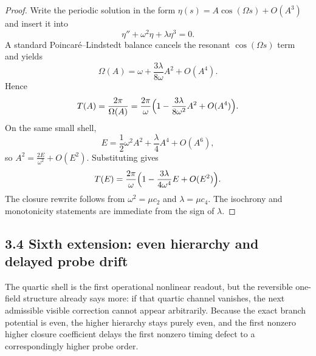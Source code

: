 \documentclass[12pt,a4paper]{article}
\begin{document}
\begin{proof}
Write the periodic solution in the form $\eta(s)=A\cos(\Omega s)+O(A^3)$ and insert it into
\[
 \eta''+\omega^2\eta+\lambda\eta^3=0.
\]
A standard Poincar\'e--Lindstedt balance cancels the resonant $\cos(\Omega s)$ term and yields
\[
 \Omega(A)=\omega+\frac{3\lambda}{8\omega}A^2+O(A^4).
\]
Hence
\[
 T(A)=\frac{2\pi}{\Omega(A)}
 =\frac{2\pi}{\omega}\Bigl(1-\frac{3\lambda}{8\omega^2}A^2+O(A^4)\Bigr).
\]
On the same small shell,
\[
 E=\frac12\omega^2A^2+\frac{\lambda}{4}A^4+O(A^6),
\]
so $A^2=\tfrac{2E}{\omega^2}+O(E^2)$. Substituting gives
\[
 T(E)=\frac{2\pi}{\omega}\Bigl(1-\frac{3\lambda}{4\omega^4}E+O(E^2)\Bigr).
\]
The closure rewrite follows from $\omega^2=\mu c_2$ and $\lambda=\mu c_4$. The isochrony and monotonicity statements are immediate from the sign of $\lambda$.
\end{proof}


\subsection*{3.4 Sixth extension: even hierarchy and delayed probe drift}
The quartic shell is the first operational nonlinear readout, but the reversible one-field structure already says more: if that quartic channel vanishes, the next admissible visible correction cannot appear arbitrarily. Because the exact branch potential is even, the higher hierarchy stays purely even, and the first nonzero higher closure coefficient delays the first nonzero timing defect to a correspondingly higher probe order.
\end{document}
